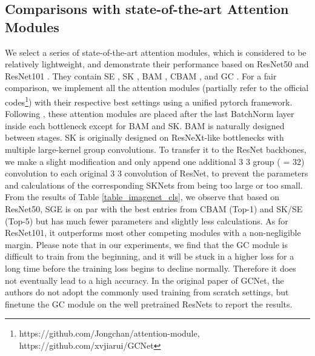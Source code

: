 \documentclass{article}
\begin{document}
	\subsection{Comparisons with state-of-the-art Attention Modules}
	We select a series of state-of-the-art attention modules, which is considered to be relatively lightweight, and demonstrate their performance based on ResNet50 and ResNet101 \cite{he2016deep,he2016identity}. They contain SE \cite{hu2018squeeze}, SK \cite{li2019selective}, BAM \cite{park2018bam}, CBAM \cite{woo2018cbam}, and GC \cite{cao2019GCNet}. For a fair comparison, we implement all the attention modules (partially refer to the official codes\footnote{https://github.com/Jongchan/attention-module, https://github.com/xvjiarui/GCNet}) with their respective best settings using a unified pytorch framework. Following \cite{hu2018squeeze,woo2018cbam}, these attention modules are placed after the last BatchNorm \cite{ioffe2015batch} layer inside each bottleneck except for BAM and SK. BAM \cite{park2018bam} is naturally designed between stages. SK \cite{li2019selective} is originally designed on ResNeXt-like bottlenecks with multiple large-kernel group convolutions. To transfer it to the ResNet backbones, we make a slight modification and only append one additional 3  3 group ( = 32) convolution to each original 3  3 convolution of ResNet, to prevent the parameters and calculations of the corresponding SKNets from being too large or too small. From the results of Table \ref{table_imagenet_cls}, we observe that based on ResNet50, SGE is on par with the best entries from CBAM (Top-1) and SK/SE (Top-5) but has much fewer parameters and slightly less calculations. As for ResNet101, it outperforms most other competing modules with a non-negligible margin. Please note that in our experiments, we find that the GC \cite{cao2019GCNet} module is difficult to train from the beginning, and it will be stuck in a higher loss for a long time before the training loss begins to decline normally. Therefore it does not eventually lead to a high accuracy. In the original paper of GCNet, the authors do not adopt the commonly used training from scratch settings, but finetune the GC module on the well pretrained ResNets to report the results.
	
\end{document}
